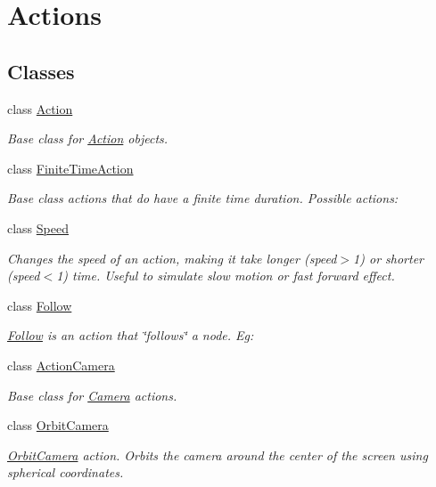 \hypertarget{group__actions}{}\section{Actions}
\label{group__actions}
\subsection*{Classes}
\begin{DoxyCompactItemize}
\item 
class \hyperlink{classAction}{Action}
\begin{DoxyCompactList}\small\item\em Base class for \hyperlink{classAction}{Action} objects. \end{DoxyCompactList}\item 
class \hyperlink{classFiniteTimeAction}{Finite\+Time\+Action}
\begin{DoxyCompactList}\small\item\em Base class actions that do have a finite time duration. Possible actions\+: \end{DoxyCompactList}\item 
class \hyperlink{classSpeed}{Speed}
\begin{DoxyCompactList}\small\item\em Changes the speed of an action, making it take longer (speed$>$1) or shorter (speed$<$1) time. Useful to simulate \textquotesingle{}slow motion\textquotesingle{} or \textquotesingle{}fast forward\textquotesingle{} effect. \end{DoxyCompactList}\item 
class \hyperlink{classFollow}{Follow}
\begin{DoxyCompactList}\small\item\em \hyperlink{classFollow}{Follow} is an action that \char`\"{}follows\char`\"{} a node. Eg\+: \end{DoxyCompactList}\item 
class \hyperlink{classActionCamera}{Action\+Camera}
\begin{DoxyCompactList}\small\item\em Base class for \hyperlink{classCamera}{Camera} actions. \end{DoxyCompactList}\item 
class \hyperlink{classOrbitCamera}{Orbit\+Camera}
\begin{DoxyCompactList}\small\item\em \hyperlink{classOrbitCamera}{Orbit\+Camera} action. Orbits the camera around the center of the screen using spherical coordinates. \end{DoxyCompactList}\item 

\end{DoxyCompactItemize}
